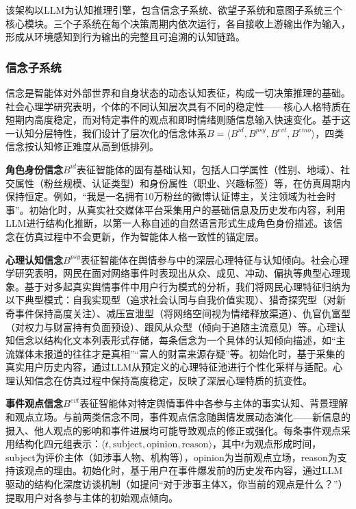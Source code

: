 \documentclass[lettersize,journal]{IEEEtran}
\begin{document}
该架构以LLM为认知推理引擎，包含信念子系统、欲望子系统和意图子系统三个核心模块。三个子系统在每个决策周期内依次运行，各自接收上游输出作为输入，形成从环境感知到行为输出的完整且可追溯的认知链路。

\subsubsection{信念子系统}

信念是智能体对外部世界和自身状态的动态认知表征，构成一切决策推理的基础。社会心理学研究表明，个体的不同认知层次具有不同的稳定性——核心人格特质在短期内高度稳定，而对特定事件的观点和即时情绪则随信息输入快速变化。基于这一认知分层特性，我们设计了层次化的信念体系$B = \langle B^{id}, B^{psy}, B^{evt}, B^{emo} \rangle$，四类信念按认知修正难度从高到低排列。

\textbf{角色身份信念}$B^{id}$表征智能体的固有基础认知，包括人口学属性（性别、地域）、社交属性（粉丝规模、认证类型）和身份属性（职业、兴趣标签）等，在仿真周期内保持恒定。例如，``我是一名拥有10万粉丝的微博认证博主，关注领域为社会时事''。初始化时，从真实社交媒体平台采集用户的基础信息及历史发布内容，利用LLM进行结构化推断，以第一人称自述的自然语言形式生成角色身份描述。该信念在仿真过程中不会更新，作为智能体人格一致性的锚定层。

\textbf{心理认知信念}$B^{psy}$表征智能体在舆情参与中的深层心理特征与认知倾向。社会心理学研究表明，网民在面对网络事件时表现出从众、成见、冲动、偏执等典型心理现象。基于对多起真实舆情事件中用户行为模式的分析，我们将网民心理特征归纳为以下典型模式：自我实现型（追求社会认同与自我价值实现）、猎奇探究型（对新奇事件保持高度关注）、减压宣泄型（将网络空间视为情绪释放渠道）、仇官仇富型（对权力与财富持有负面预设）、跟风从众型（倾向于追随主流意见）等。心理认知信念以结构化文本列表形式存储，每条信念为一个具体的认知倾向描述，如``主流媒体未报道的往往才是真相''``富人的财富来源存疑''等。初始化时，基于采集的真实用户历史内容，通过LLM从预定义的心理特征池进行个性化采样与适配。心理认知信念在仿真过程中保持高度稳定，反映了深层心理特质的抗变性。

\textbf{事件观点信念}$B^{evt}$表征智能体对特定舆情事件中各参与主体的事实认知、背景理解和观点立场。与前两类信念不同，事件观点信念随舆情发展动态演化——新信息的摄入、他人观点的影响和事件进展均可能导致观点的修正或强化。每条事件观点采用结构化四元组表示：$\langle t, \text{subject}, \text{opinion}, \text{reason} \rangle$，其中$t$为观点形成时间，subject为评价主体（如涉事人物、机构等），opinion为当前观点立场，reason为支持该观点的理由。初始化时，基于用户在事件爆发前的历史发布内容，通过LLM驱动的结构化深度访谈机制（如提问``对于涉事主体X，你当前的观点是什么？''）提取用户对各参与主体的初始观点倾向。
\end{document}
